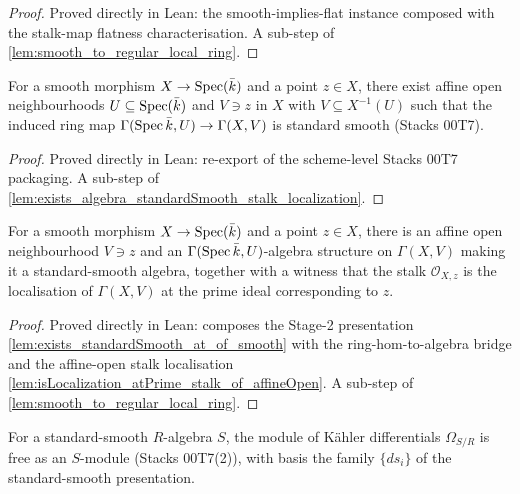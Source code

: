 \begin{proof}
  Proved directly in Lean: the smooth-implies-flat instance composed with the
  stalk-map flatness characterisation. A sub-step of
  \cref{lem:smooth_to_regular_local_ring}.
\end{proof}

\begin{lemma}
  \label{lem:exists_standardSmooth_at_of_smooth}
  For a smooth morphism \(X \to \operatorname{Spec}(\bar k)\) and a point \(z \in X\), there
  exist affine open neighbourhoods \(U \subseteq \operatorname{Spec}(\bar k)\) and \(V \ni z\)
  in \(X\) with \(V \subseteq X^{-1}(U)\) such that the induced ring map
  \(\Gamma(\operatorname{Spec} \bar k, U) \to \Gamma(X, V)\) is standard smooth (Stacks 00T7).
\end{lemma}

\begin{proof}
  Proved directly in Lean: re-export of the scheme-level Stacks 00T7 packaging.
  A sub-step of \cref{lem:exists_algebra_standardSmooth_stalk_localization}.
\end{proof}

\begin{lemma}
  \label{lem:exists_algebra_standardSmooth_stalk_localization}
  For a smooth morphism \(X \to \operatorname{Spec}(\bar k)\) and a point \(z \in X\), there is
  an affine open neighbourhood \(V \ni z\) and an \(\Gamma(\operatorname{Spec} \bar k, U)\)-algebra
  structure on \(\Gamma(X, V)\) making it a standard-smooth algebra, together with a
  witness that the stalk \(\mathcal O_{X, z}\) is the localisation of \(\Gamma(X, V)\)
  at the prime ideal corresponding to \(z\).
\end{lemma}

\begin{proof}
  Proved directly in Lean: composes the Stage-2 presentation
  \cref{lem:exists_standardSmooth_at_of_smooth} with the ring-hom-to-algebra bridge
  and the affine-open stalk localisation
  \cref{lem:isLocalization_atPrime_stalk_of_affineOpen}. A sub-step of
  \cref{lem:smooth_to_regular_local_ring}.
\end{proof}

\begin{lemma}
  \label{lem:module_free_kaehler_standardSmooth}
  For a standard-smooth \(R\)-algebra \(S\), the module of K\"ahler differentials
  \(\Omega_{S/R}\) is free as an \(S\)-module (Stacks 00T7(2)), with basis the family
  \(\{ds_i\}\) of the standard-smooth presentation.
\end{lemma}

